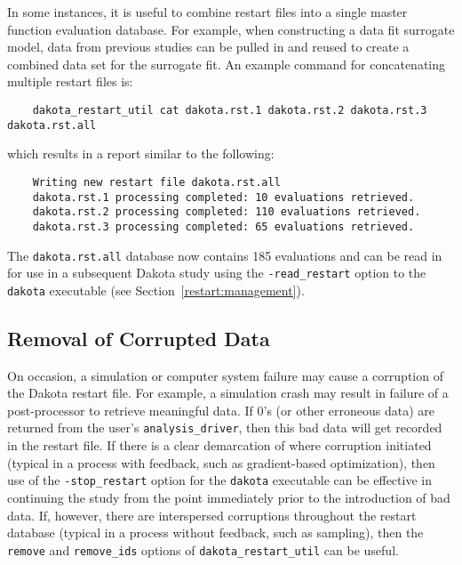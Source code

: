 In some instances, it is useful to combine restart files into a single
master function evaluation database. For example, when constructing a
data fit surrogate model, data from previous studies can be pulled in
and reused to create a combined data set for the surrogate fit. An
example command for concatenating multiple restart files is:
\begin{small}
\begin{verbatim}
    dakota_restart_util cat dakota.rst.1 dakota.rst.2 dakota.rst.3 dakota.rst.all
\end{verbatim}
\end{small}
which results in a report similar to the following:
\begin{verbatim}
    Writing new restart file dakota.rst.all
    dakota.rst.1 processing completed: 10 evaluations retrieved.
    dakota.rst.2 processing completed: 110 evaluations retrieved.
    dakota.rst.3 processing completed: 65 evaluations retrieved.
\end{verbatim}

The \texttt{dakota.rst.all} database now contains 185 evaluations and
can be read in for use in a subsequent Dakota study using the
\texttt{-read\_restart} option to the \texttt{dakota} executable (see
Section~\ref{restart:management}).

\subsection{Removal of Corrupted Data}\label{restart:utility:removal}

On occasion, a simulation or computer system failure may cause a
corruption of the Dakota restart file. For example, a simulation crash
may result in failure of a post-processor to retrieve meaningful data.
If 0's (or other erroneous data) are returned from the user's
\texttt{analysis\_driver}, then this bad data will get recorded in the
restart file. If there is a clear demarcation of where corruption
initiated (typical in a process with feedback, such as gradient-based
optimization), then use of the \texttt{-stop\_restart} option for the
\texttt{dakota} executable can be effective in continuing the study
from the point immediately prior to the introduction of bad data. If,
however, there are interspersed corruptions throughout the restart
database (typical in a process without feedback, such as sampling),
then the \texttt{remove} and \texttt{remove\_ids} options of
\texttt{dakota\_restart\_util} can be useful.

